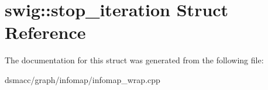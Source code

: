 \hypertarget{structswig_1_1stop__iteration}{}\section{swig\+:\+:stop\+\_\+iteration Struct Reference}
\label{structswig_1_1stop__iteration}


The documentation for this struct was generated from the following file\+:\begin{DoxyCompactItemize}
\item 
dsmacc/graph/infomap/infomap\+\_\+wrap.\+cpp\end{DoxyCompactItemize}
